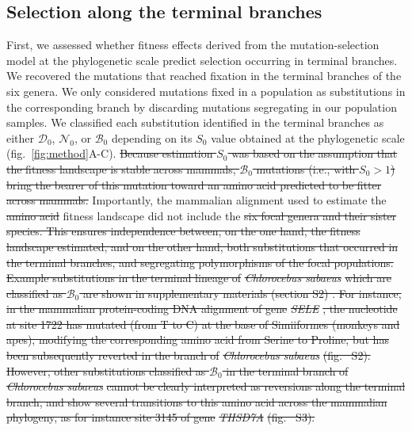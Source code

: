 \documentclass{article} %
\newcommand{\Sphy}{S_{0}}
\newcommand{\SphyDel}{\mathcal{D}_0}
\newcommand{\SphyNeu}{\mathcal{N}_0}
\newcommand{\SphyBen}{\mathcal{B}_0}
\providecommand{\DIFaddtex}[1]{{\protect\color{blue}\uwave{#1}}} %
\providecommand{\DIFdeltex}[1]{{\protect\color{red}\sout{#1}}}                      %
\providecommand{\DIFaddbegin}{} %
\providecommand{\DIFaddend}{} %
\providecommand{\DIFdelbegin}{} %
\providecommand{\DIFdelend}{} %
\providecommand{\DIFadd}[1]{\texorpdfstring{\DIFaddtex{#1}}{#1}} %
\providecommand{\DIFdel}[1]{\texorpdfstring{\DIFdeltex{#1}}{}} %
\newcommand{\DIFscaledelfig}{0.5}
\newlength{\DIFdelgraphicswidth} %
\newlength{\DIFdelgraphicsheight} %
\newcommand{\DIFaddincludegraphics}[2][]{{\color{blue}\fbox{\DIFOincludegraphics[#1]{#2}}}} %
\newcommand{\DIFdelincludegraphics}[2][]{%
\sbox{\DIFdelgraphicsbox}{\DIFOincludegraphics[#1]{#2}}%
\settoboxwidth{\DIFdelgraphicswidth}{\DIFdelgraphicsbox} %
\settoboxtotalheight{\DIFdelgraphicsheight}{\DIFdelgraphicsbox} %
\scalebox{\DIFscaledelfig}{%
\parbox[b]{\DIFdelgraphicswidth}{\usebox{\DIFdelgraphicsbox}\\[-\baselineskip] \rule{\DIFdelgraphicswidth}{0em}}\llap{\resizebox{\DIFdelgraphicswidth}{\DIFdelgraphicsheight}{%
\setlength{\unitlength}{\DIFdelgraphicswidth}%
\begin{picture}(1,1)%
\thicklines\linethickness{2pt} %
{\color[rgb]{1,0,0}\put(0,0){\framebox(1,1){}}}%
{\color[rgb]{1,0,0}\put(0,0){\line( 1,1){1}}}%
{\color[rgb]{1,0,0}\put(0,1){\line(1,-1){1}}}%
\end{picture}%
}\hspace*{3pt}}} %
} %
\DeclareRobustCommand{\DIFaddbegin}{\DIFOaddbegin \let\includegraphics\DIFaddincludegraphics} %
\DeclareRobustCommand{\DIFaddend}{\DIFOaddend \let\includegraphics\DIFOincludegraphics} %
\DeclareRobustCommand{\DIFdelbegin}{\DIFOdelbegin \let\includegraphics\DIFdelincludegraphics} %
\DeclareRobustCommand{\DIFdelend}{\DIFOaddend \let\includegraphics\DIFOincludegraphics} %
\begin{document}
    \subsection*{Selection along the terminal branches}
    First, we assessed whether fitness effects derived from the mutation-selection model at the phylogenetic scale predict selection occurring in terminal branches.
    We recovered the mutations that reached fixation in the terminal branches of the six genera.
    We only considered mutations fixed in a population as substitutions in the corresponding branch by discarding mutations segregating in our population samples.
    We classified each substitution identified in the terminal branches as either $\SphyDel$, $\SphyNeu$, or $\SphyBen$ depending on its $\Sphy$ value obtained at the phylogenetic scale (fig.~\ref{fig:method}A-C).
    \DIFdelbegin \DIFdel{Because estimation $\Sphy$ was based on the assumption that the fitness landscape is stable across mammals, $\SphyBen$ mutations (i.e., with $\Sphy>1$) bring the bearer of this mutation toward an amino acid predicted to be fitter across mammals.
}\DIFdelend Importantly, the mammalian alignment used to estimate the \DIFdelbegin \DIFdel{amino acid }\DIFdelend \DIFaddbegin \DIFadd{amino-acid }\DIFaddend fitness landscape did not include the \DIFdelbegin \DIFdel{six focal genera and their sister species.
This ensures independence between, on the one hand, the fitness landscape estimated, and on the other hand, both substitutions that occurred in the terminal branches, and segregating polymorphisms of the focal populations.
Example substitutions in the terminal lineage of }\textit{\DIFdel{Chlorocebus sabaeus}} %
\DIFdel{which are classified as $\SphyBen$ are shown in supplementary materials (section S2) .
For instance, in the mammalian protein-coding DNA alignment of gene }\textit{\DIFdel{SELE}}%
\DIFdel{, the nucleotide at site 1722 has mutated (from T to C) at the base of Simiiformes (monkeys and apes), modifying the corresponding amino acid from Serine to Proline, but has been subsequently reverted in the branch of }\textit{\DIFdel{Chlorocebus sabaeus}} %
\DIFdel{(fig.
    ~S2).
However, other substitutions classified as $\SphyBen$ in the terminal branch of }\textit{\DIFdel{Chlorocebus sabaeus}} %
\DIFdel{cannot be clearly interpreted as reversions along the terminal branch, and show several transitions to this amino acid across the mammalian phylogeny, as for instance site 3145 of gene }\textit{\DIFdel{THSD7A}} %
\DIFdel{(fig.
    ~S3).
}%
\end{document}
